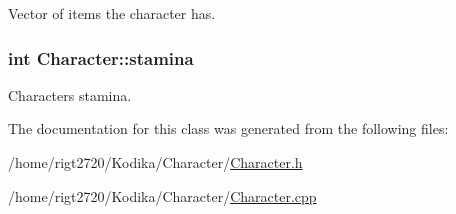 Vector of items the character has. 

\hypertarget{classCharacter_a0f17daa14530e07f0ca479c2dd97f38b}{
\subsubsection[{stamina}]{\setlength{\rightskip}{0pt plus 5cm}int Character\-::stamina\hspace{0.3cm}{\ttfamily [protected]}}}\label{classCharacter_a0f17daa14530e07f0ca479c2dd97f38b}


Characters stamina. 



The documentation for this class was generated from the following files\-:\begin{DoxyCompactItemize}
\item 
/home/rigt2720/\-Kodika/\-Character/\hyperlink{Character_8h}{Character.\-h}\item 
/home/rigt2720/\-Kodika/\-Character/\hyperlink{Character_8cpp}{Character.\-cpp}\end{DoxyCompactItemize}
